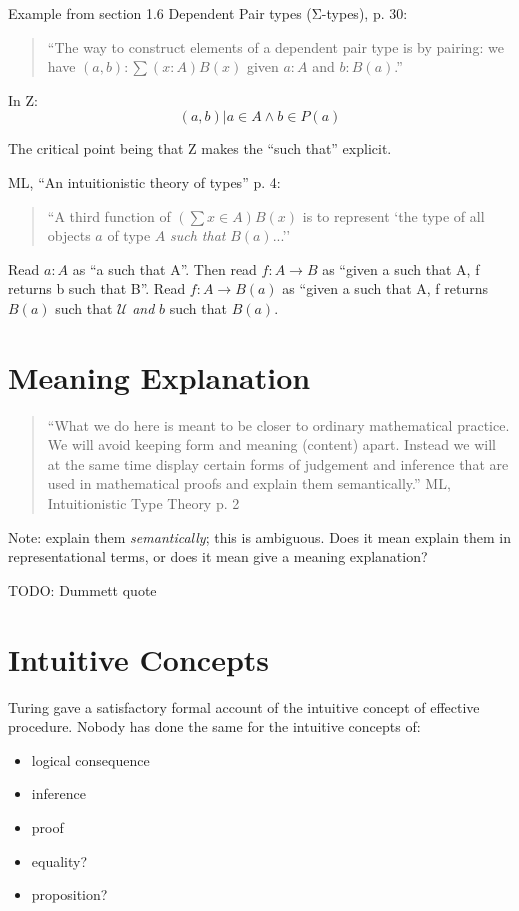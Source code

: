 \documentclass{article}
\begin{document}
Example from section 1.6 Dependent Pair types (Σ-types), p. 30:

\begin{quote}
``The way to construct elements of a dependent pair type is by
pairing: we have \((a,b) : ∑(x:A) B(x)\) given \(a : A\) and \(b :
B(a)\).''
\end{quote}

In Z: \[ {(a,b) | a\in A \land b\in P(a)} \]

The critical point being that Z makes the ``such that'' explicit.

ML, ``An intuitionistic theory of types'' p. 4:
\begin{quote}
``A third function of \((\sum x\in A)B(x)\) is to represent `the type
of all objects \(a\) of type \(A\) \emph{such that} \(B(a)\)...''
\end{quote}

Read \(a{:}A\) as ``a such that A''.  Then read \(f{:}A\to B\) as ``given a
such that A, f returns b such that B''.  Read \(f{:}A\to B(a)\) as
``given a such that A, f returns \(B(a)\) such that \(\mathcal{U}\)
\emph{and} \(b\) such that \(B(a)\).

\section{Meaning Explanation}

\begin{quote}
``What we do here is meant to be closer to ordinary mathematical practice. We will avoid keeping form and meaning (content) apart. Instead we will at the same time display certain forms of judgement and inference that are used in mathematical proofs and explain them semantically.'' ML, Intuitionistic Type Theory p. 2
\end{quote}

Note: explain them \emph{semantically}; this is ambiguous.  Does it
mean explain them in representational terms, or does it mean give a
meaning explanation?

TODO:  Dummett quote

\section{Intuitive Concepts}

Turing gave a satisfactory formal account of the intuitive concept of
effective procedure.  Nobody has done the same for the intuitive
concepts of:

\begin{itemize}
\item logical consequence
\item inference
\item proof
\item equality?
\item proposition?
\end{itemize}
\end{document}
